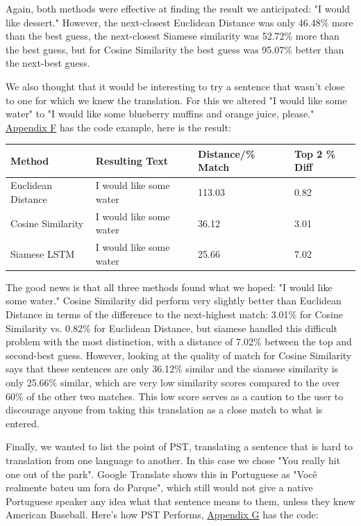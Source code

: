 \documentclass[runningheads]{llncs}
\begin{document}
	Again, both methods were effective at finding the result we anticipated: "I would like dessert." However, the next-closest Euclidean Distance was only 46.48\% more than the best guess,  the next-closest Siamese similarity was 52.72\% more than the best guess, but for Cosine Similarity the best guess was 95.07\% better than the next-best guess. 

	We also thought that it would be interesting to try a sentence that wasn't close to one for which we knew the translation. For this we altered "I would like some water" to "I would like some blueberry muffins and orange juice, please."  \hyperlink{Appendix F}{Appendix F} has the code example, here is the result:



\vspace{10 mm}
	\begin{minipage}{\linewidth}
			\begin{tabular}{| l | l | l | l |}
			  \hline			
			  Method & Resulting Text & Distance/\% Match & Top 2 \% Diff \\
			  \hline			
			  Euclidean Distance & I would like some water & 113.03 & 0.82 \\
			  \hline			
			  Cosine Similarity & I would like some water & 36.12 & 3.01 \\
			  \hline  
			  Siamese LSTM & I would like some water & 25.66 & 7.02 \\
			  \hline
			\end{tabular}
	\end{minipage}
	\afterpage{\clearpage}
\vspace{10 mm}


	The good news is that all three methods found what we hoped: "I would like some water." Cosine Similarity did perform very slightly better than Euclidean Distance in terms of the difference to the next-highest match: 3.01\% for Cosine Similarity vs. 0.82\% for Euclidean Distance, but siamese handled this difficult problem with the most distinction, with a distance of 7.02\% between the top and second-best guess. However, looking at the quality of match for Cosine Similarity says that these sentences are only 36.12\% similar and the siamese similarity is only 25.66\% similar, which are very low similarity scores compared to the over 60\% of the other two matches. This low score serves as a caution to the user to discourage anyone from taking this translation as a close match to what is entered.

	Finally, we wanted to list the point of PST, translating a sentence that is hard to translation from one language to another. In this case we chose "You really hit one out of the park". Google Translate shows this in Portuguese as "Você realmente bateu um fora do Parque", which still would not give a native Portuguese speaker any idea what that sentence means to them, unless they knew American Baseball. Here's how PST Performs, \hyperlink{Appendix G}{Appendix G} has the code:
\end{document}

